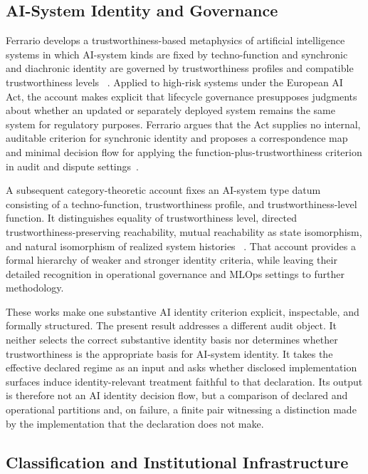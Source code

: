 \documentclass[11pt]{article}
\theoremstyle{plain}
\theoremstyle{definition}
\theoremstyle{remark}
\begin{document}
\subsection{AI-System Identity and Governance}

Ferrario develops a trustworthiness-based metaphysics of artificial intelligence systems
in which AI-system kinds are fixed by techno-function
and synchronic and diachronic identity are governed
by trustworthiness profiles and compatible trustworthiness levels
~\citep{ferrario2025metaphysics}.
Applied to high-risk systems under the European AI Act,
the account makes explicit that lifecycle governance
presupposes judgments about whether an updated or separately deployed system
remains the same system for regulatory purposes.
Ferrario argues that the Act supplies no internal, auditable criterion for synchronic identity
and proposes a correspondence map and minimal decision flow
for applying the function-plus-trustworthiness criterion
in audit and dispute settings~\citep{ferrario2026aia}.

A subsequent category-theoretic account fixes an AI-system type datum consisting of
a techno-function, trustworthiness profile, and trustworthiness-level function.
It distinguishes equality of trustworthiness level,
directed trustworthiness-preserving reachability,
mutual reachability as state isomorphism,
and natural isomorphism of realized system histories
~\citep{ferrario2026category}.
That account provides a formal hierarchy of weaker and stronger identity criteria,
while leaving their detailed recognition in operational governance and MLOps settings
to further methodology.

These works make one substantive AI identity criterion explicit, inspectable, and formally structured.
The present result addresses a different audit object.
It neither selects the correct substantive identity basis
nor determines whether trustworthiness is
the appropriate basis for AI-system identity.
It takes the effective declared regime as an input
and asks whether disclosed implementation surfaces
induce identity-relevant treatment faithful to that declaration.
Its output is therefore not an AI identity decision flow,
but a comparison of declared and operational partitions
and, on failure, a finite pair witnessing a distinction made by the implementation
that the declaration does not make.

\subsection{Classification and Institutional Infrastructure}
\end{document}
